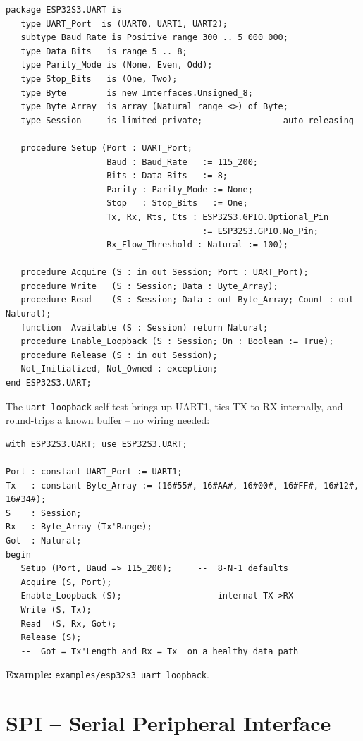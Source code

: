 \begin{lstlisting}
package ESP32S3.UART is
   type UART_Port  is (UART0, UART1, UART2);
   subtype Baud_Rate is Positive range 300 .. 5_000_000;
   type Data_Bits   is range 5 .. 8;
   type Parity_Mode is (None, Even, Odd);
   type Stop_Bits   is (One, Two);
   type Byte        is new Interfaces.Unsigned_8;
   type Byte_Array  is array (Natural range <>) of Byte;
   type Session     is limited private;            --  auto-releasing

   procedure Setup (Port : UART_Port;
                    Baud : Baud_Rate   := 115_200;
                    Bits : Data_Bits   := 8;
                    Parity : Parity_Mode := None;
                    Stop   : Stop_Bits   := One;
                    Tx, Rx, Rts, Cts : ESP32S3.GPIO.Optional_Pin
                                       := ESP32S3.GPIO.No_Pin;
                    Rx_Flow_Threshold : Natural := 100);

   procedure Acquire (S : in out Session; Port : UART_Port);
   procedure Write   (S : Session; Data : Byte_Array);
   procedure Read    (S : Session; Data : out Byte_Array; Count : out Natural);
   function  Available (S : Session) return Natural;
   procedure Enable_Loopback (S : Session; On : Boolean := True);
   procedure Release (S : in out Session);
   Not_Initialized, Not_Owned : exception;
end ESP32S3.UART;
\end{lstlisting}

The \texttt{uart\_loopback} self-test brings up UART1, ties TX to RX internally,
and round-trips a known buffer -- no wiring needed:

\begin{lstlisting}
with ESP32S3.UART; use ESP32S3.UART;

Port : constant UART_Port := UART1;
Tx   : constant Byte_Array := (16#55#, 16#AA#, 16#00#, 16#FF#, 16#12#, 16#34#);
S    : Session;
Rx   : Byte_Array (Tx'Range);
Got  : Natural;
begin
   Setup (Port, Baud => 115_200);     --  8-N-1 defaults
   Acquire (S, Port);
   Enable_Loopback (S);               --  internal TX->RX
   Write (S, Tx);
   Read  (S, Rx, Got);
   Release (S);
   --  Got = Tx'Length and Rx = Tx  on a healthy data path
\end{lstlisting}

\noindent\textbf{Example:} \texttt{examples/esp32s3\_uart\_loopback}.

\section{SPI -- Serial Peripheral Interface}
\label{app:int:spi}

